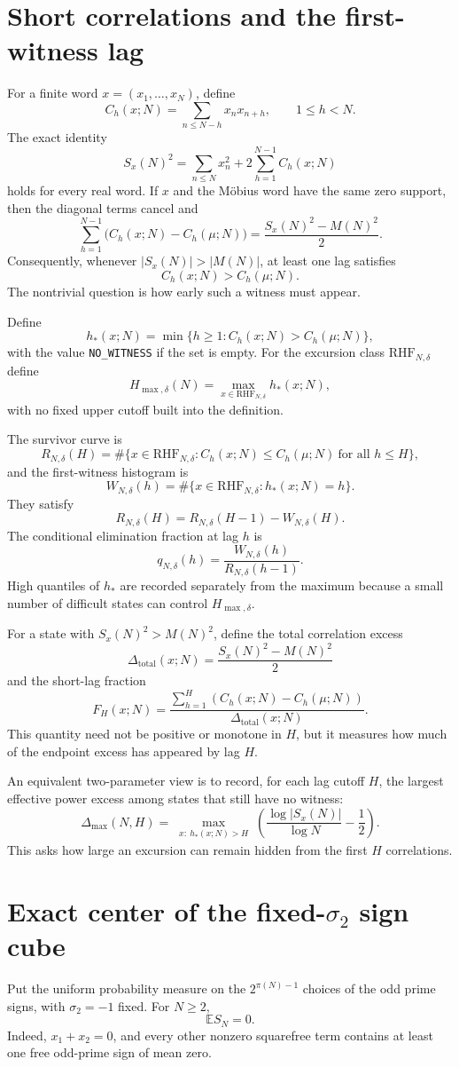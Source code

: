 \documentclass[11pt]{article}
\newcommand{\RHF}{\mathrm{RHF}}
\begin{document}
\section{Short correlations and the first-witness lag}
For a finite word $x=(x_1,\ldots,x_N)$, define
\[
 C_h(x;N)=\sum_{n\le N-h}x_nx_{n+h},
 \qquad1\le h<N.
\]
The exact identity
\[
 S_x(N)^2
 =\sum_{n\le N}x_n^2
 +2\sum_{h=1}^{N-1}C_h(x;N)
\]
holds for every real word. If $x$ and the Möbius word have the same zero support, then the diagonal terms cancel and
\[
 \sum_{h=1}^{N-1}
 \bigl(C_h(x;N)-C_h(\mu;N)\bigr)
 =\frac{S_x(N)^2-M(N)^2}{2}.
\]
Consequently, whenever $|S_x(N)|>|M(N)|$, at least one lag satisfies
\[
 C_h(x;N)>C_h(\mu;N).
\]
The nontrivial question is how early such a witness must appear.

Define
\[
 h_*(x;N)
 =\min\{h\ge1:C_h(x;N)>C_h(\mu;N)\},
\]
with the value \texttt{NO\_WITNESS} if the set is empty. For the excursion class $\RHF_{N,\delta}$ define
\[
 H_{\max,\delta}(N)
 =\max_{x\in\RHF_{N,\delta}}h_*(x;N),
\]
with no fixed upper cutoff built into the definition.

The survivor curve is
\[
 R_{N,\delta}(H)
 =\#\{x\in\RHF_{N,\delta}:
 C_h(x;N)\le C_h(\mu;N)\ \text{for all }h\le H\},
\]
and the first-witness histogram is
\[
 W_{N,\delta}(h)
 =\#\{x\in\RHF_{N,\delta}:h_*(x;N)=h\}.
\]
They satisfy
\[
 R_{N,\delta}(H)
 =R_{N,\delta}(H-1)-W_{N,\delta}(H).
\]
The conditional elimination fraction at lag $h$ is
\[
 q_{N,\delta}(h)
 =\frac{W_{N,\delta}(h)}{R_{N,\delta}(h-1)}.
\]
High quantiles of $h_*$ are recorded separately from the maximum because a small number of difficult states can control $H_{\max,\delta}$.

For a state with $S_x(N)^2>M(N)^2$, define the total correlation excess
\[
 \Delta_{\mathrm{total}}(x;N)
 =\frac{S_x(N)^2-M(N)^2}{2}
\]
and the short-lag fraction
\[
 F_H(x;N)
 =\frac{\sum_{h=1}^H(C_h(x;N)-C_h(\mu;N))}
 {\Delta_{\mathrm{total}}(x;N)}.
\]
This quantity need not be positive or monotone in $H$, but it measures how much of the endpoint excess has appeared by lag $H$.

An equivalent two-parameter view is to record, for each lag cutoff $H$, the largest effective power excess among states that still have no witness:
\[
 \Delta_{\max}(N,H)
 =\max_{\substack{x:\ h_*(x;N)>H}}
 \left(
 \frac{\log|S_x(N)|}{\log N}-\frac12
 \right).
\]
This asks how large an excursion can remain hidden from the first $H$ correlations.

\section{Exact center of the fixed-$\sigma_2$ sign cube}
Put the uniform probability measure on the $2^{\pi(N)-1}$ choices of the odd prime signs, with $\sigma_2=-1$ fixed. For $N\ge2$,
\[
 \mathbb E S_N=0.
\]
Indeed, $x_1+x_2=0$, and every other nonzero squarefree term contains at least one free odd-prime sign of mean zero.
\end{document}
